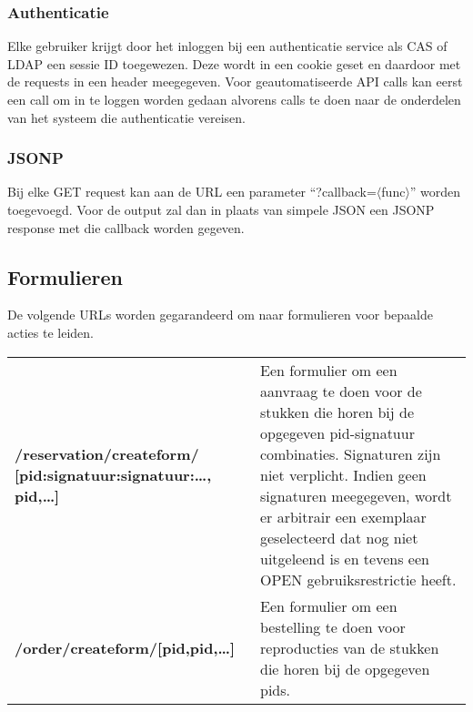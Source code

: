 \documentclass[a4paper,titlepage]{report}
\begin{document}
      \subsubsection{Authenticatie}
        Elke gebruiker krijgt door het inloggen bij een authenticatie service
        als CAS of LDAP 
        een sessie ID toegewezen. Deze wordt
        in een cookie geset en daardoor met de requests in een header
        meegegeven. Voor geautomatiseerde API calls kan eerst een call om in
        te loggen worden gedaan alvorens calls te doen naar de onderdelen van
        het systeem die authenticatie vereisen.

      \subsubsection{JSONP}
        Bij elke GET request kan aan de URL een parameter
        ``?callback=$\langle$func$\rangle$'' worden toegevoegd. Voor de output
        zal dan in plaats van simpele JSON een JSONP response met die callback
        worden gegeven.

    \subsection{Formulieren}
      De volgende URLs worden gegarandeerd om naar formulieren voor bepaalde
      acties te leiden.\\

      \begin{tabular}{p{} p{}}
        \textbf{/reservation/createform/ [pid:signatuur:signatuur:\ldots,
        pid,\ldots]} & Een formulier om een
        aanvraag te doen voor de stukken die horen bij de opgegeven
        pid-signatuur combinaties. Signaturen zijn niet verplicht. Indien geen
        signaturen meegegeven, wordt er arbitrair een exemplaar geselecteerd dat nog
        niet uitgeleend is en tevens een OPEN gebruiksrestrictie heeft. \\
        \textbf{/order/createform/[pid,pid,\ldots]} & Een formulier om een
        bestelling te doen voor reproducties van de stukken die horen bij de
        opgegeven pids. \\
      \end{tabular}

    \pagebreak
\end{document}

